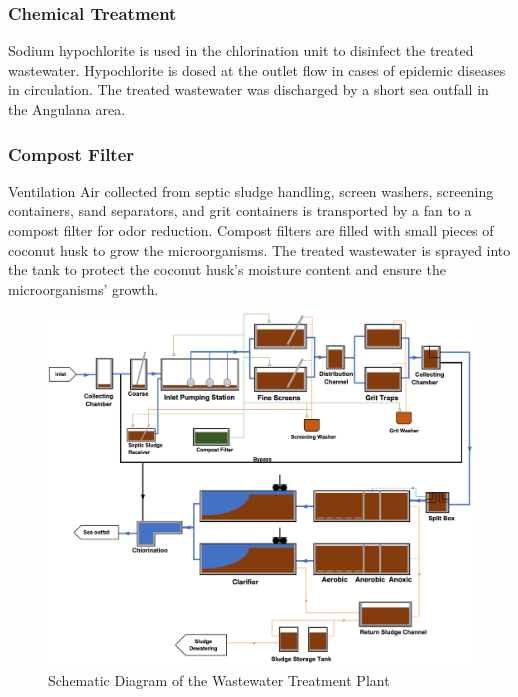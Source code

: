 \subsubsection{Chemical Treatment}
Sodium hypochlorite is used in the chlorination unit to disinfect the treated wastewater. Hypochlorite is dosed at the outlet flow in cases of epidemic diseases in circulation. The treated wastewater was discharged by a short sea outfall in the Angulana area.  

\subsubsection{Compost Filter}
Ventilation Air collected from septic sludge handling, screen washers, screening containers, sand separators, and grit containers is transported by a fan to a compost filter for odor reduction. Compost filters are filled with small pieces of coconut husk to grow the microorganisms. The treated wastewater is sprayed into the tank to protect the coconut husk's moisture content and ensure the microorganisms' growth. 

\begin{figure}[H]
\centering
\includegraphics[width=1\linewidth]{material_and_methodology/diagram_of_treatment_plant.png}
\caption{Schematic Diagram of the Wastewater Treatment Plant}
\label{fig:treatment_plant}
\end{figure}

